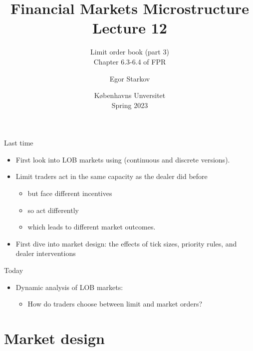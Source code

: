 \documentclass[english,10pt
,aspectratio=169
]{beamer}
\title{Financial Markets Microstructure \\ Lecture 12}
\subtitle{Limit order book (part 3)\\
	Chapter 6.3-6.4 of FPR}
\author{Egor Starkov}
\date{K{\o}benhavns Unversitet \\
	Spring 2023}
\begin{document}
\frame[plain]{\titlepage}


\begin{frame}{Last time}
	\begin{itemize}
		\item First look into LOB markets using \cite{glosten_is_1994} (continuous and discrete versions).
		\item Limit traders act in the same capacity as the dealer did before
		\begin{itemize}
			\item but face different incentives
			\item so act differently
			\item which leads to different market outcomes.
		\end{itemize}
		\item First dive into market design: the effects of tick sizes, priority rules, and dealer interventions
	\end{itemize}
\end{frame}


\begin{frame}{Today}
	\begin{itemize}
		\item Dynamic analysis of LOB markets:
		\begin{itemize}
			\item How do traders choose between limit and market orders?
		\end{itemize}
	\end{itemize}
\end{frame}







\section{Market design}
\end{document}
